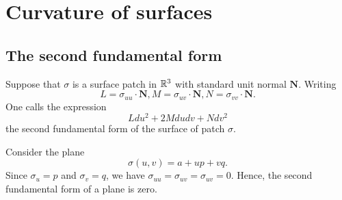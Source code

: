 \section{Curvature of surfaces}

\subsection{The second fundamental form}

Suppose that $\sigma$ is a surface patch in $\mathbb{R}^3$ with standard unit
normal $\bm{N}$.
Writing
\[
  L = \sigma_{uu} \cdot \bm{N},
  M = \sigma_{uv} \cdot \bm{N},
  N = \sigma_{vv} \cdot \bm{N}.
\]
One calls the expression
\[
  L du^2 + 2 M du dv + N dv^2  
\]
the second fundamental form of the surface of patch $\sigma$.

\begin{example}
  Consider the plane
  \[
    \sigma(u, v) = a + up + vq.  
  \]
  Since $\sigma_u = p$ and $\sigma_v = q$, we have
  $\sigma_{uu} = \sigma_{uv} = \sigma_{uv} = 0$.
  Hence, the second fundamental form of a plane is zero.
\end{example}